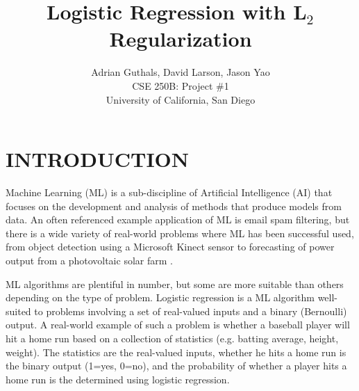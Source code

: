 
\title{Logistic Regression with L$_2$ Regularization}

\author{Adrian Guthals, David Larson, Jason Yao \\
CSE 250B: Project \#1 \\
University of California, San Diego \\
}




\maketitle







\section{INTRODUCTION}
\label{sec:intro}

Machine Learning (ML) is a sub-discipline of Artificial Intelligence (AI) that focuses on the development and analysis of methods that produce models from data. An often referenced example application of ML is email spam filtering, but there is a wide variety of real-world problems where ML has been successful used, from object detection using a Microsoft Kinect sensor \cite{Kinect} to forecasting of power output from a photovoltaic solar farm \cite{solar}.

ML algorithms are plentiful in number, but some are more suitable than others depending on the type of problem. Logistic regression is a ML algorithm well-suited to problems involving a set of real-valued inputs and a binary (Bernoulli) output. A real-world example of such a problem is whether a baseball player will hit a home run based on a collection of statistics (e.g. batting average, height, weight). The statistics are the real-valued inputs, whether he hits a home run is the binary output (1=yes, 0=no), and the probability of whether a player hits a home run is the determined using logistic regression. 

